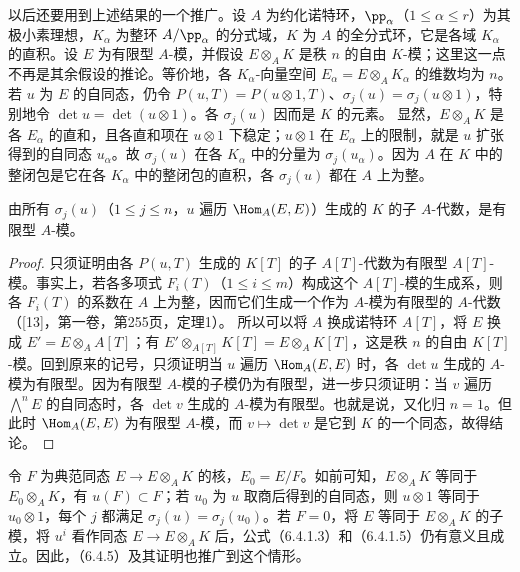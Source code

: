 以后还要用到上述结果的一个推广。设 $A$ 为约化诺特环，$\pp_\alpha$（$1\leq\alpha\leq r$）为其极小素理想，$K_\alpha$ 为整环 $A/\pp_\alpha$ 的分式域，$K$ 为 $A$ 的全分式环，它是各域 $K_\alpha$ 的直积。设 $E$ 为有限型 $A$-模，并假设 $E\otimes_A K$ 是秩 $n$ 的自由 $K$-模；这里这一点不再是其余假设的推论。等价地，各 $K_\alpha$-向量空间 $E_\alpha=E\otimes_A K_\alpha$ 的维数均为 $n$。若 $u$ 为 $E$ 的自同态，仍令 $P(u,T)=P(u\otimes1,T)$、$\sigma_j(u)=\sigma_j(u\otimes1)$，特别地令 $\det u=\det(u\otimes1)$。各 $\sigma_j(u)$ 因而是 $K$ 的元素。
显然，$E\otimes_A K$ 是各 $E_\alpha$ 的直和，且各直和项在 $u\otimes1$ 下稳定；$u\otimes1$ 在 $E_\alpha$ 上的限制，就是 $u$ 扩张得到的自同态 $u_\alpha$。故 $\sigma_j(u)$ 在各 $K_\alpha$ 中的分量为 $\sigma_j(u_\alpha)$。因为 $A$ 在 $K$ 中的整闭包是它在各 $K_\alpha$ 中的整闭包的直积，各 $\sigma_j(u)$ 都在 $A$ 上为整。

由所有 $\sigma_j(u)$（$1\leq j\leq n$，$u$ 遍历 $\Hom_A(E,E)$）生成的 $K$ 的子 $A$-代数，是有限型 $A$-模。
\begin{proof}
只须证明由各 $P(u,T)$ 生成的 $K[T]$ 的子 $A[T]$-代数为有限型 $A[T]$-模。事实上，若各多项式 $F_i(T)$（$1\leq i\leq m$）构成这个 $A[T]$-模的生成系，则各 $F_i(T)$ 的系数在 $A$ 上为整，因而它们生成一个作为 $A$-模为有限型的 $A$-代数（[13]，第一卷，第255页，定理1）。
所以可以将 $A$ 换成诺特环 $A[T]$，将 $E$ 换成 $E'=E\otimes_A A[T]$；有 $E'\otimes_{A[T]}K[T]=E\otimes_A K[T]$，这是秩 $n$ 的自由 $K[T]$-模。回到原来的记号，只须证明当 $u$ 遍历 $\Hom_A(E,E)$ 时，各 $\det u$ 生成的 $A$-模为有限型。因为有限型 $A$-模的子模仍为有限型，进一步只须证明：当 $v$ 遍历 $\bigwedge^nE$ 的自同态时，各 $\det v$ 生成的 $A$-模为有限型。也就是说，又化归 $n=1$。但此时 $\Hom_A(E,E)$ 为有限型 $A$-模，而 $v\mapsto\det v$ 是它到 $K$ 的一个同态，故得结论。
\end{proof}

令 $F$ 为典范同态 $E\to E\otimes_A K$ 的核，$E_0=E/F$。如前可知，$E\otimes_A K$ 等同于 $E_0\otimes_A K$，有 $u(F)\subset F$；若 $u_0$ 为 $u$ 取商后得到的自同态，则 $u\otimes1$ 等同于 $u_0\otimes1$，每个 $j$ 都满足 $\sigma_j(u)=\sigma_j(u_0)$。若 $F=0$，将 $E$ 等同于 $E\otimes_A K$ 的子模，将 $u^i$ 看作同态 $E\to E\otimes_A K$ 后，公式（6.4.1.3）和（6.4.1.5）仍有意义且成立。因此，（6.4.5）及其证明也推广到这个情形。

